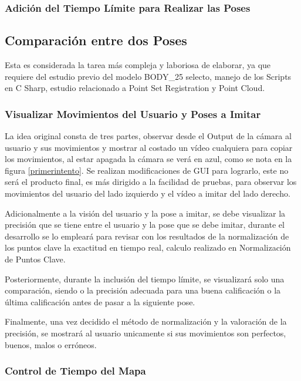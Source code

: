 \subsubsection{Adición del Tiempo Límite para Realizar las Poses}



\subsection{Comparación entre dos Poses}

Esta es considerada la tarea más compleja y laboriosa de elaborar, ya que requiere del estudio previo del modelo BODY\_25 selecto, manejo de los Scripts en C Sharp, estudio relacionado a Point Set Registration y Point Cloud. 


\subsubsection{Visualizar Movimientos del Usuario y Poses a Imitar}

La idea original consta de tres partes, observar desde el Output de la cámara al usuario y sus movimientos y mostrar al costado un vídeo cualquiera para copiar los movimientos, al estar apagada la cámara se verá en azul, como se nota en la figura \ref{primerintento}.  Se realizan modificaciones de GUI para lograrlo, este no será el producto final, es más dirigido a la facilidad de pruebas, para observar los movimientos del usuario del lado izquierdo y el vídeo a imitar del lado derecho.

Adicionalmente a la visión del usuario y la pose a imitar, se debe visualizar la precisión que se tiene entre el usuario y la pose que se debe imitar, durante el desarrollo se lo empleará para revisar con los resultados de la normalización de los puntos clave la exactitud en tiempo real, calculo realizado en Normalización de Puntos Clave. 

Posteriormente, durante la inclusión del tiempo límite, se visualizará solo una comparación, siendo o la precisión adecuada para una buena calificación o la última calificación antes de pasar a la siguiente pose.

Finalmente, una vez decidido el método de normalización y la valoración de la precisión, se mostrará al usuario unicamente si sus movimientos son perfectos, buenos, malos o erróneos.

\subsubsection{Control de Tiempo del Mapa}

